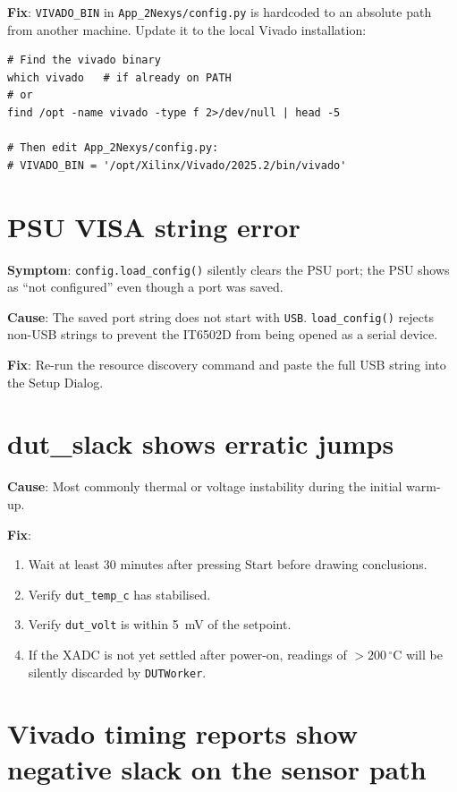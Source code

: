 \documentclass[12pt, a4paper]{report}
\begin{document}
\textbf{Fix}: \texttt{VIVADO\_BIN} in \texttt{App\_2Nexys/config.py} is hardcoded
to an absolute path from another machine. Update it to the local Vivado installation:

\begin{lstlisting}[style=shell]
# Find the vivado binary
which vivado   # if already on PATH
# or
find /opt -name vivado -type f 2>/dev/null | head -5

# Then edit App_2Nexys/config.py:
# VIVADO_BIN = '/opt/Xilinx/Vivado/2025.2/bin/vivado'
\end{lstlisting}

\section{PSU VISA string error}

\textbf{Symptom}: \texttt{config.load\_config()} silently clears the PSU port;
the PSU shows as ``not configured'' even though a port was saved.

\textbf{Cause}: The saved port string does not start with \texttt{USB}.
\texttt{load\_config()} rejects non-USB strings to prevent the IT6502D from
being opened as a serial device.

\textbf{Fix}: Re-run the resource discovery command and paste the full USB string
into the Setup Dialog.

\section{dut\_slack shows erratic jumps}

\textbf{Cause}: Most commonly thermal or voltage instability during the initial warm-up.

\textbf{Fix}:
\begin{enumerate}
  \item Wait at least 30 minutes after pressing Start before drawing conclusions.
  \item Verify \texttt{dut\_temp\_c} has stabilised.
  \item Verify \texttt{dut\_volt} is within 5~mV of the setpoint.
  \item If the XADC is not yet settled after power-on, readings of $> 200\,^\circ$C
        will be silently discarded by \texttt{DUTWorker}.
\end{enumerate}

\section{Vivado timing reports show negative slack on the sensor path}
\end{document}
